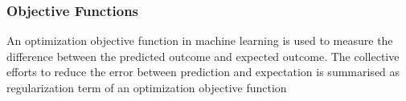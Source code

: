 \subsubsection{Objective Functions}
An optimization objective function in machine learning is used to measure the difference between the predicted outcome and expected outcome. The collective efforts to reduce the error between prediction and expectation is summarised as regularization term of an optimization objective function 